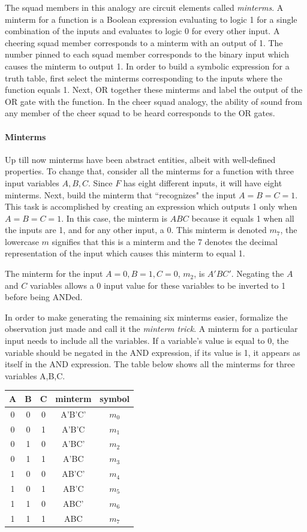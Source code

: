The squad members in this analogy are circuit elements called 
{\it minterms}.  A minterm for a function 
is a Boolean expression evaluating to logic 1 for a single 
combination of the inputs and evaluates to logic 0 for every 
other input.  A cheering squad member corresponds to a minterm with 
an output of 1.  The number pinned to each squad member corresponds
to the binary input which causes the minterm to output 1.  In order 
to build a symbolic expression for a truth table, first select the
minterms corresponding to the inputs where the function equals 1.  
Next, OR together these minterms and label the output of
the OR gate with the function.  In the cheer squad analogy, the ability of
sound from any member of the cheer squad to be heard corresponds
to the OR gates.  

\paragraph{Minterms}
Up till now minterms have been abstract entities, albeit with
well-defined properties.  To change that, consider all
the minterms for a function  with three input variables 
$A,B,C$.  Since $F$ has eight different inputs, it will have eight 
minterms.  Next, build the minterm that ``recognizes" the input $A=B=C=1$.  
This task is accomplished by creating an expression which outputs 1 only when 
$A=B=C=1$.  In this case, the minterm is $ABC$ because it equals 
1 when all the inputs are 1, and for any other input, a 0.
This minterm is denoted $m_7$, the lowercase $m$ signifies that 
this is a minterm and the 7 denotes the decimal representation 
of the input which causes this minterm to equal 1.  

The minterm
for the input $A=0, B=1, C=0$, $m_2$, is $A'BC'$.  Negating the
$A$ and $C$ variables allows a 0 input value for these variables to 
be inverted to 1 before being ANDed.  

In order to make generating 
the remaining six minterms easier, formalize the observation 
just made and call it the {\it minterm trick}.  
 \label{page:MinTrick}
A minterm for a particular input needs to include all the variables.
If a variable's value is equal to 0, the variable should be negated in 
the AND expression, if its value is 1, it appears as itself in the
AND expression. The table below shows all the minterms for three 
variables A,B,C.

\begin{tabular}{c|c|c||c|c}
A & B & C & minterm & symbol	\\ \hline
0 & 0 & 0 & A'B'C'  & $m_0$	\\ \hline
0 & 0 & 1 & A'B'C   & $m_1$	\\ \hline
0 & 1 & 0 & A'BC'   & $m_2$	\\ \hline
0 & 1 & 1 & A'BC    & $m_3$	\\ \hline
1 & 0 & 0 & AB'C'   & $m_4$	\\ \hline
1 & 0 & 1 & AB'C    & $m_5$	\\ \hline
1 & 1 & 0 & ABC'    & $m_6$	\\ \hline
1 & 1 & 1 & ABC     & $m_7$	\\ 
\end{tabular}

